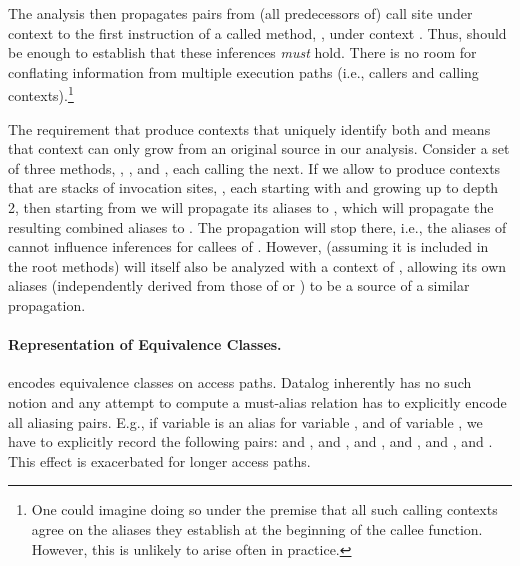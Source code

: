 
The analysis then propagates  pairs from (all
predecessors of) call site  under context  to the
first instruction of a called method, , under context
. Thus,  should be enough to establish that
these inferences \emph{must} hold. There is no room for conflating
information from multiple execution paths (i.e., callers and calling
contexts).\footnote{One could imagine doing so under the premise that
  all such calling contexts agree on the aliases they establish at the
  beginning of the callee function. However, this is unlikely to arise
  often in practice.}

The requirement that  produce contexts that
uniquely identify both  and  means that context can
only grow from an original source in our
analysis. Consider a set of three methods, , , and
, each calling the next. If we allow 
to produce contexts that are stacks of invocation sites, ,
each starting with  and growing up to depth 2, then
starting from  we will propagate its aliases to ,
which will propagate the resulting combined aliases to . The
propagation will stop there, i.e., the aliases of  cannot
influence inferences for callees of . However, 
(assuming it is included in the root methods) will itself also be
analyzed with a context of , allowing its own aliases
(independently derived from those of  or ) to be a
source of a similar propagation.


\paragraph{Representation of Equivalence Classes.}

 encodes equivalence classes on access paths. Datalog
inherently has no such notion and any attempt to compute a must-alias relation
has to explicitly encode all aliasing pairs. E.g., if variable  is an
alias for variable , and  of variable , we have to
explicitly record the following pairs:  and ,  and
,  and ,  and ,  and , 
and . This effect is exacerbated for longer access paths.

